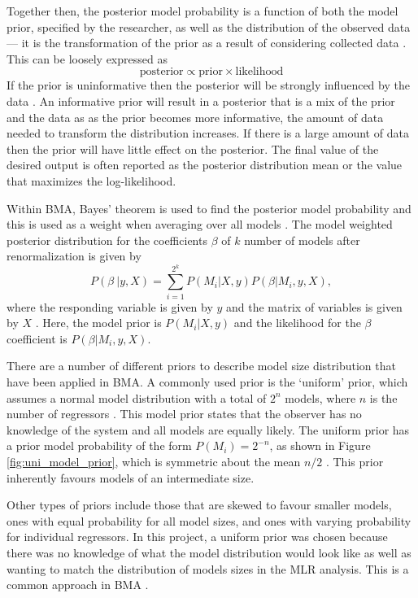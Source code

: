 \documentclass[12pt]{article}
\begin{document}
Together then, the posterior model probability is a function of both the model prior, specified by the researcher, as well as the distribution of the observed data --- it is the transformation of the prior as a result of considering collected data \citep{Wasserman2000}. This can be loosely expressed as
\begin{equation}
\textrm{posterior} \propto \textrm{prior} \times \textrm{likelihood}
\end{equation}
If the prior is uninformative then the posterior will be strongly influenced by the data \citep{Wasserman2000}. An informative prior will result in a posterior that is a mix of the prior and the data as as the prior becomes more informative, the amount of data needed to transform the distribution increases. If there is a large amount of data then the prior will have little effect on the posterior. The final value of the desired output is often reported as the posterior distribution mean or the value that maximizes the log-likelihood. 

Within BMA, Bayes' theorem is used to find the posterior model probability and this is used as a weight when averaging over all models \citep{Wasserman2000}. The model weighted posterior distribution for the coefficients $\beta$ of $k$ number of models after renormalization is given by 
\begin{equation}
P(\beta\ | y,X) = \sum\limits_{i=1}^{2^k} P(M_i | X,y)P(\beta | M_i , y, X),
\end{equation}
where the responding variable is given by $y$ and the matrix of variables is given by $X$ \citep{Raftery1997}. Here, the model prior is $P(M_i | X,y)$ and the likelihood for the $\beta$ coefficient is $P(\beta | M_i , y, X)$.

There are a number of different priors to describe model size distribution that have been applied in BMA. A commonly used prior is the `uniform' prior, which assumes a normal model distribution with a total of $2^n$ models, where $n$ is the number of regressors \citep{Wasserman2000}.  This model prior states that the observer has no knowledge of the system and all models are equally likely. The uniform prior has a prior model probability of the form $P(M_i)=2^{-n}$, as shown in Figure \ref{fig:uni_model_prior}, which is symmetric about the mean $n/2$ \citep{Zeugner2015}. This prior inherently favours models of an intermediate size. 

Other types of priors include those that are skewed to favour smaller models, ones with equal probability for all model sizes, and ones with varying probability for individual regressors. In this project, a uniform prior was chosen because there was no knowledge of what the model distribution would look like as well as wanting to match the distribution of models sizes in the MLR analysis. This is a common approach in BMA \citep{Wasserman2000}.
\end{document}
